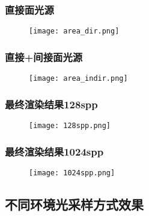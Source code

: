 \documentclass[14pt]{scrartcl} %
\begin{document}
\pagebreak

\subsubsection{直接面光源}

\begin{figure}[h] %
	\centering
	\texttt{[image: area\_dir.png]} %
\end{figure}

\subsubsection{直接+间接面光源}

\begin{figure}[h] %
	\centering
	\texttt{[image: area\_indir.png]} %
\end{figure}

\pagebreak

\subsubsection{最终渲染结果128spp}

\begin{figure}[h] %
	\centering
	\texttt{[image: 128spp.png]} %
\end{figure}

\subsubsection{最终渲染结果1024spp}

\begin{figure}[h] %
	\centering
	\texttt{[image: 1024spp.png]} %
\end{figure}

\pagebreak
\subsection{不同环境光采样方式效果}
\end{document}
